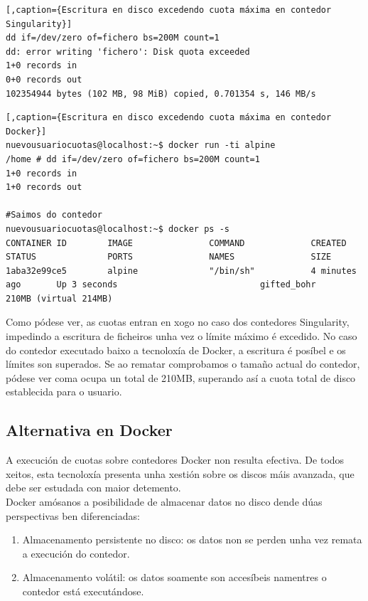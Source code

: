 \begin{lstlisting}[,caption={Escritura en disco excedendo cuota máxima en contedor Singularity}]
dd if=/dev/zero of=fichero bs=200M count=1
dd: error writing 'fichero': Disk quota exceeded
1+0 records in
0+0 records out
102354944 bytes (102 MB, 98 MiB) copied, 0.701354 s, 146 MB/s
\end{lstlisting}

\begin{lstlisting}[,caption={Escritura en disco excedendo cuota máxima en contedor Docker}]
nuevousuariocuotas@localhost:~$ docker run -ti alpine
/home # dd if=/dev/zero of=fichero bs=200M count=1
1+0 records in
1+0 records out

#Saimos do contedor
nuevousuariocuotas@localhost:~$ docker ps -s 
CONTAINER ID        IMAGE               COMMAND             CREATED             STATUS              PORTS               NAMES               SIZE
1aba32e99ce5        alpine              "/bin/sh"           4 minutes ago       Up 3 seconds                            gifted_bohr         210MB (virtual 214MB)
\end{lstlisting}

Como pódese ver, as cuotas entran en xogo no caso dos contedores Singularity, impedindo a escritura de ficheiros unha vez o límite máximo é excedido. No caso do contedor executado baixo a tecnoloxía de Docker, a escritura é posíbel e os límites son superados. Se ao rematar comprobamos o tamaño actual do contedor, pódese ver coma ocupa un total de 210MB, superando así a cuota total de disco establecida para o usuario.

\subsection{Alternativa en Docker}

A execución de cuotas sobre contedores Docker non resulta efectiva. De todos xeitos, esta tecnoloxía presenta unha xestión sobre os discos máis avanzada, que debe ser estudada con maior detemento.\\

Docker amósanos a posibilidade de almacenar datos no disco dende dúas perspectivas ben diferenciadas:

\begin{enumerate}
    \item Almacenamento persistente no disco: os datos non se perden unha vez remata a execución do contedor.
    \item Almacenamento volátil: os datos soamente son accesíbeis namentres o contedor está executándose.
\end{enumerate}

